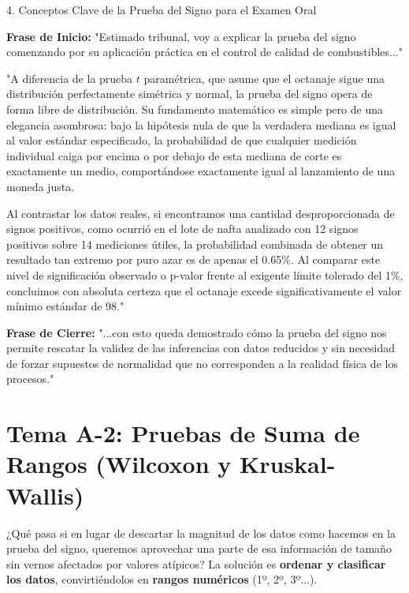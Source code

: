 \documentclass[11pt,a4paper]{article}
\begin{document}
\begin{subsection}{4. Conceptos Clave de la Prueba del Signo para el Examen Oral}
    \begin{guion}
        \textbf{Frase de Inicio:} "Estimado tribunal, voy a explicar la prueba del signo comenzando por su aplicación práctica en el control de calidad de combustibles..." \par
        \vspace{6pt}
        "A diferencia de la prueba $t$ paramétrica, que asume que el octanaje sigue una distribución perfectamente simétrica y normal, la prueba del signo opera de forma libre de distribución. Su fundamento matemático es simple pero de una elegancia asombrosa: bajo la hipótesis nula de que la verdadera mediana es igual al valor estándar especificado, la probabilidad de que cualquier medición individual caiga por encima o por debajo de esta mediana de corte es exactamente un medio, comportándose exactamente igual al lanzamiento de una moneda justa. 

        Al contrastar los datos reales, si encontramos una cantidad desproporcionada de signos positivos, como ocurrió en el lote de nafta analizado con 12 signos positivos sobre 14 mediciones útiles, la probabilidad combinada de obtener un resultado tan extremo por puro azar es de apenas el 0.65\%. Al comparar este nivel de significación observado o p-valor frente al exigente límite tolerado del 1\%, concluimos con absoluta certeza que el octanaje excede significativamente el valor mínimo estándar de 98." \par
        \vspace{6pt}
        \textbf{Frase de Cierre:} "...con esto queda demostrado cómo la prueba del signo nos permite rescatar la validez de las inferencias con datos reducidos y sin necesidad de forzar supuestos de normalidad que no corresponden a la realidad física de los procesos."
    \end{guion}
\end{subsection}

\newpage
\section{Tema A-2: Pruebas de Suma de Rangos (Wilcoxon y Kruskal-Wallis)}

¿Qué pasa si en lugar de descartar la magnitud de los datos como hacemos en la prueba del signo, queremos aprovechar una parte de esa información de tamaño sin vernos afectados por valores atípicos? La solución es \textbf{ordenar y clasificar los datos}, convirtiéndolos en \textbf{rangos numéricos} (1º, 2º, 3º...).
\end{document}
